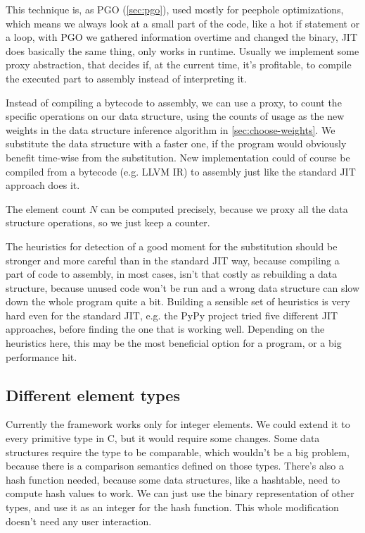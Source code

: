 \documentclass[a4paper,11pt]{article}
\begin{document}
            This technique is, as PGO (\autoref{sec:pgo}), used mostly for peephole optimizations, which means we always
            look at a small part of the code, like a hot if statement or a loop, with PGO we gathered information
            overtime and changed the binary, JIT does basically the same thing, only works in runtime. Usually we
            implement some proxy abstraction, that decides if, at the current time, it's profitable, to compile the
            executed part to assembly instead of interpreting it.

            Instead of compiling a bytecode to assembly, we can use a proxy, to count the specific operations on our
            data structure, using the counts of usage as the new weights in the data structure inference algorithm in
            \autoref{sec:choose-weights}. We substitute the data structure with a faster one, if the program would
            obviously benefit time-wise from the substitution. New implementation could of course be compiled from a
            bytecode (e.g. LLVM IR) to assembly just like the standard JIT approach does it.

            The element count $N$ can be computed precisely, because we proxy all the data structure operations, so we
            just keep a counter.

            The heuristics for detection of a good moment for the substitution should be stronger and more careful than
            in the standard JIT way, because compiling a part of code to assembly, in most cases, isn't that costly as
            rebuilding a data structure, because unused code won't be run and a wrong data structure can slow down the
            whole program quite a bit. Building a sensible set of heuristics is very hard even for the standard JIT,
            e.g.  the PyPy project tried five different JIT approaches, before finding the one that is working well.
            Depending on the heuristics here, this may be the most beneficial option for a program, or a big performance
            hit.

	\subsection{Different element types}

		Currently the framework works only for integer elements. We could extend it to every primitive type in
		C, but it would require some changes.  Some data structures require the type to be comparable, which
		wouldn't be a big problem, because there is a comparison semantics defined on those types. There's also
		a hash function needed, because some data structures, like a hashtable, need to compute hash values to
		work. We can just use the binary representation of other types, and use it as an integer for the hash
		function. This whole modification doesn't need any user interaction.
\end{document}
